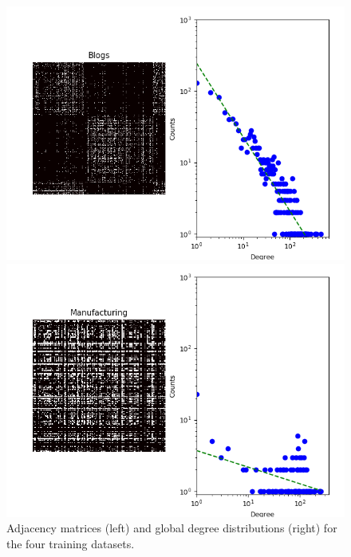 \begin{figure}[h]
\begin{minipage}{0.24\textwidth}
            \includegraphics[width=\textwidth]{img/corpus/blogs_dd}
        \end{minipage}
        \begin{minipage}{0.24\textwidth}
            \includegraphics[width=\textwidth]{img/corpus/manufacturing_dd}
        \end{minipage}
	\caption{Adjacency matrices (left) and global degree distributions (right) for the four training datasets.}
	\label{fig:corpuses}
\end{figure}
